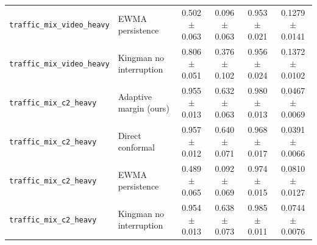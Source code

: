 \begin{tabular}{llcccc}
\texttt{traffic\_mix\_video\_heavy} & EWMA persistence & 0.502 $\pm$ 0.063 & 0.096 $\pm$ 0.063 & 0.953 $\pm$ 0.021 & 0.1279 $\pm$ 0.0141 \\
\texttt{traffic\_mix\_video\_heavy} & Kingman no interruption & 0.806 $\pm$ 0.051 & 0.376 $\pm$ 0.102 & 0.956 $\pm$ 0.024 & 0.1372 $\pm$ 0.0102 \\
\hline
\texttt{traffic\_mix\_c2\_heavy} & Adaptive margin (ours) & 0.955 $\pm$ 0.013 & 0.632 $\pm$ 0.063 & 0.980 $\pm$ 0.013 & 0.0467 $\pm$ 0.0069 \\
\texttt{traffic\_mix\_c2\_heavy} & Direct conformal & 0.957 $\pm$ 0.012 & 0.640 $\pm$ 0.071 & 0.968 $\pm$ 0.017 & 0.0391 $\pm$ 0.0066 \\
\texttt{traffic\_mix\_c2\_heavy} & EWMA persistence & 0.489 $\pm$ 0.065 & 0.092 $\pm$ 0.069 & 0.974 $\pm$ 0.015 & 0.0810 $\pm$ 0.0127 \\
\texttt{traffic\_mix\_c2\_heavy} & Kingman no interruption & 0.954 $\pm$ 0.013 & 0.638 $\pm$ 0.073 & 0.985 $\pm$ 0.011 & 0.0744 $\pm$ 0.0076 \\
\hline
\end{tabular}
